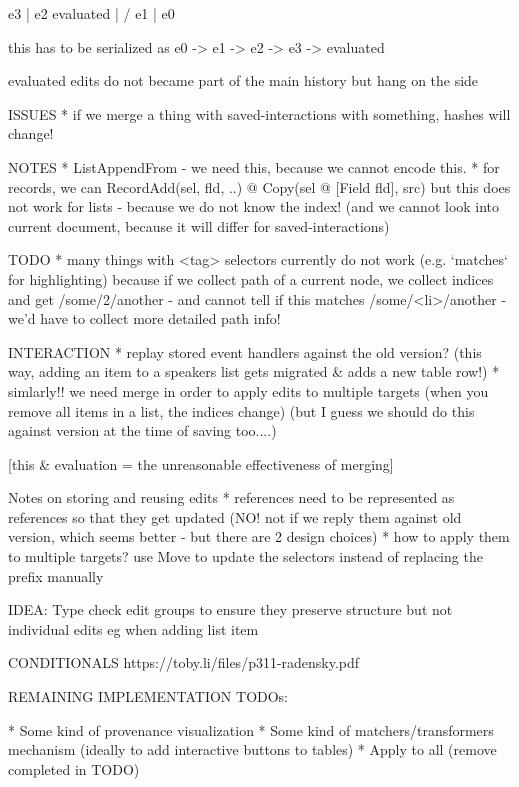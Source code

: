 \documentclass[sigconf]{acmart}
\begin{document}
  e3
  |
  e2   evaluated
  |  /
  e1
  |
  e0

  this has to be serialized as e0 -> e1 -> e2 -> e3 -> evaluated

  evaluated edits do not became part of the main history
  but hang on the side

ISSUES
* if we merge a thing with saved-interactions with something, hashes will change!

NOTES
* ListAppendFrom - we need this, because we cannot encode this.
* for records, we can RecordAdd(sel, fld, ..) @ Copy(sel @ [Field fld], src) but
  this does not work for lists - because we do not know the index!
  (and we cannot look into current document, because it will differ for saved-interactions)


TODO
* many things with <tag> selectors currently do not work
  (e.g. `matches` for highlighting) because if we collect path of a current node,
  we collect indices and get /some/2/another - and cannot tell if this matches
  /some/<li>/another - we'd have to collect more detailed path info!

INTERACTION
* replay stored event handlers against the old version?
  (this way, adding an item to a speakers list gets migrated \& adds a new table row!)
* simlarly!! we need merge in order to apply edits to multiple targets
  (when you remove all items in a list, the indices change)
  (but I guess we should do this against version at the time of saving too....)

[this \& evaluation = the unreasonable effectiveness of merging]

Notes on storing and reusing edits
* references need to be represented as references so that they get updated
  (NO! not if we reply them against old version, which seems better - but there are 2 design choices)
* how to apply them to multiple targets? use Move to update the selectors instead of
  replacing the prefix manually

IDEA: Type check edit groups to ensure they preserve structure but not individual edits eg when adding list item

CONDITIONALS
https://toby.li/files/p311-radensky.pdf


REMAINING IMPLEMENTATION TODOs:

* Some kind of provenance visualization
* Some kind of matchers/transformers mechanism (ideally to add interactive buttons to tables)
* Apply to all (remove completed in TODO)

\newpage
~



\end{document}

